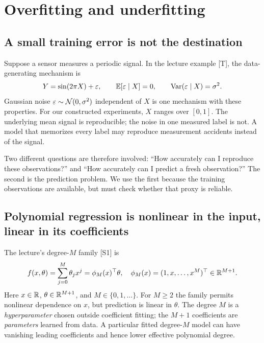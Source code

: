\section{Overfitting and underfitting}
\label{sec:reg:fit}
\subsection{A small training error is not the destination}
Suppose a sensor measures a periodic signal. In the lecture example [T], the data-generating mechanism is
\begin{equation}
Y=\sin(2\pi X)+\varepsilon,\qquad \mathbb{E}[\varepsilon\mid X]=0,\qquad \operatorname{Var}(\varepsilon\mid X)=\sigma^2.
\label{eq:reg:sine}
\end{equation}
Gaussian noise $\varepsilon\sim\mathcal{N}(0,\sigma^2)$ independent of $X$ is one mechanism with these properties. For our constructed experiments, $X$ ranges over $[0,1]$. The underlying mean signal is reproducible; the noise in one measured label is not. A model that memorizes every label may reproduce measurement accidents instead of the signal.

Two different questions are therefore involved: ``How accurately can I reproduce these observations?'' and ``How accurately can I predict a fresh observation?'' The second is the prediction problem. We use the first because the training observations are available, but must check whether that proxy is reliable.

\subsection{Polynomial regression is nonlinear in the input, linear in its coefficients}
The lecture's degree-$M$ family [S1] is
\begin{equation}
f(x,\theta)=\sum_{j=0}^M\theta_jx^j
=\phi_M(x)^\top\theta,\quad
\phi_M(x)=(1,x,\ldots,x^M)^\top\in\mathbb{R}^{M+1}.
\end{equation}
Here $x\in\mathbb{R}$, $\theta\in\mathbb{R}^{M+1}$, and $M\in\{0,1,\ldots\}$. For $M\geq2$ the family permits nonlinear dependence on $x$, but prediction is linear in $\theta$. The degree $M$ is a \emph{hyperparameter} chosen outside coefficient fitting; the $M+1$ coefficients are \emph{parameters} learned from data. A particular fitted degree-$M$ model can have vanishing leading coefficients and hence lower effective polynomial degree.

